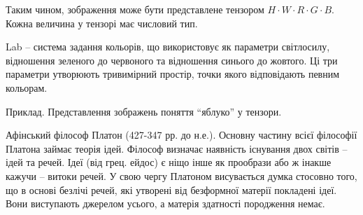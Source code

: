 Таким чином, зображення може бути представлене тензором $H \cdot W \cdot R \cdot G \cdot B$. Кожна величина у тензорі має числовий тип.

Lab -- система задання кольорів, що використовує як параметри світлосилу, відношення зеленого до червоного та відношення синього до жовтого. Ці три параметри утворюють тривимірний простір, точки якого відповідають певним кольорам. 

Приклад. Представлення зображень поняття ``яблуко'' у тензори.

Афінський філософ Платон (427-347 рр. до н.е.). Основну  частину  всієї  філософії  Платона  займає теорія ідей.  Філософ  визначає  наявність існування  двох світів -- ідей та речей.  Ідеї  (від  грец. ейдос)  є  ніщо інше  як  прообрази  або  ж  інакше  кажучи -- витоки  речей.  У свою  чергу   Платоном  висувається  думка стосовно  того,  що  в основі  безлічі  речей,  які  утворені   від  безформної  матерії  покладені  ідеї.  Вони  виступають   джерелом  усього, а   матерія  здатності  породження  немає.
